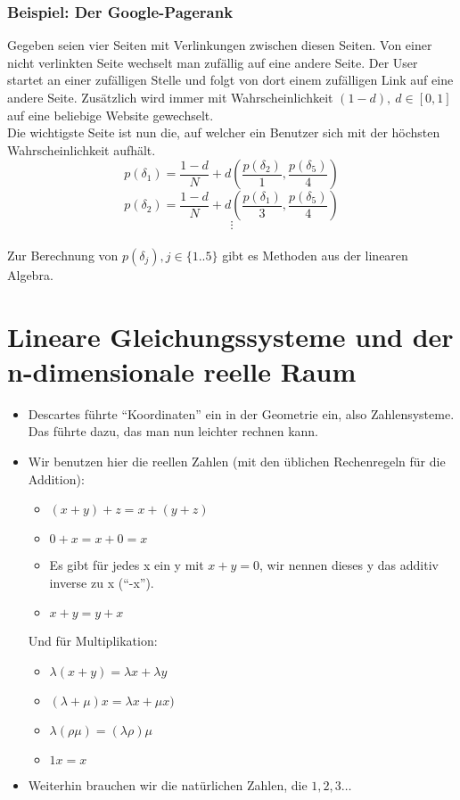 \documentclass{report}
\newcommand{\lb}{\lambda}
\theoremstyle{customrem}
\theoremstyle{customdef}
\begin{document}
	\subsection*{Beispiel: Der Google-Pagerank}
	Gegeben seien vier Seiten mit Verlinkungen zwischen diesen Seiten. Von einer nicht verlinkten Seite wechselt man zufällig auf eine andere Seite. Der User startet an einer zufälligen Stelle und folgt von dort einem zufälligen Link auf eine andere Seite. Zusätzlich wird immer mit Wahrscheinlichkeit \((1-d), \ d \in [0, 1]\) auf eine beliebige Website gewechselt.\\
	Die wichtigste Seite ist nun die, auf welcher ein Benutzer sich mit der höchsten Wahrscheinlichkeit aufhält.\\
	\[
	p(\delta_1) = \frac{1-d}{N} + d\left(\frac{p(\delta_2)}{1}, \frac{p(\delta_5)}{4}\right)\]\[
	p(\delta_2) = \frac{1-d}{N} + d\left(\frac{p(\delta_1)}{3}, \frac{p(\delta_5)}{4}\right)\]\[
	\vdots
	\]\\
	Zur Berechnung von \(p(\delta_j), j \in \{1..5\}\) gibt es Methoden aus der linearen Algebra.
	\newpage
	\tableofcontents
	\newpage
	\chapter[Lineare Gleichungssysteme und der n-dimensionale reelle Raum]{Lineare Gleichungssysteme und der \\ n-dimensionale reelle Raum}
	
	\begin{itemize}
		\item Descartes führte ``Koordinaten'' ein in der Geometrie ein, also Zahlensysteme. Das führte dazu, das man nun leichter rechnen kann.
		\item Wir benutzen hier die reellen Zahlen (mit den üblichen Rechenregeln für die Addition):
		\begin{itemize}
			\item \((x + y) + z = x + (y + z)\) 
			\item \(0 + x = x + 0 = x\) 
			\item Es gibt für jedes x ein y mit \(x + y = 0\), wir nennen dieses y das additiv inverse zu x (``-x'').
			\item \(x + y = y + x\)
		\end{itemize}
		Und für Multiplikation:
		\begin{itemize}
			\item \(\lambda (x + y) = \lambda x + \lambda y\) 
			\item \((\lambda + \mu) x = \lambda x + \mu x)\)
			\item \(\lb(\rho\mu)=(\lb\rho)\mu\)
			\item \(1x = x\)
		\end{itemize}
		\item Weiterhin brauchen wir die natürlichen Zahlen, die \(1,2,3\dots\)
	\end{itemize}
	
\end{document}
